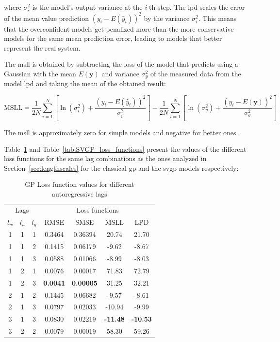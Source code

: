 where $\sigma_i^2$ is the model's output variance at the \textit{i}-th step.
The \acrshort{lpd} scales the error of the mean value prediction $\left(y_i -
E(\hat{y}_i)\right)^{2}$ by the variance $\sigma_i^2$. This means that the
overconfident models get penalized more than the more conservative models for
the same mean prediction error, leading to models that better represent
the real system. 

The \acrfull{msll} is obtained by subtracting the loss of the model that
predicts using a Gaussian with the mean $E(\boldsymbol{y})$ and variance
$\sigma_y^2$ of the measured data from the model \acrshort{lpd} and taking the
mean of the obtained result:

\begin{equation}
    \text{MSLL} = \frac{1}{2N}\sum_{i=1}^N\left[
        \ln{\left(\sigma_i^2\right) + \frac{\left(y_i -
        E\left(\hat{y}_i\right)\right)^2}{\sigma_i^2}}
    \right] - \frac{1}{2N}\sum_{i=1}^N\left[
        \ln{\left(\sigma_y^2\right) + \frac{\left(y_i -
        E\left(\boldsymbol{y}\right)\right)^2}{\sigma_y^2}}
    \right]
\end{equation}

The \acrshort{msll} is approximately zero for simple models and negative for
better ones.

Table~\ref{tab:GP_loss_functions} and Table~\ref{tab:SVGP_loss_functions}
present the values of the different loss functions for the same lag combinations
as the ones analyzed in Section~\ref{sec:lengthscales} for the classical
\acrshort{gp} and the \acrshort{svgp} models respectively: 

\begin{table}[ht]
\centering
    \begin{tabular}{||c c c|c c c c||}
        \hline
        \multicolumn{3}{||c|}{Lags} & \multicolumn{4}{c||}{Loss functions}\\
        $l_w$ & $l_u$ & $l_y$ & RMSE & SMSE & MSLL & LPD\\
        \hline \hline
        1 & 1 & 1 & 0.3464 & 0.36394 & 20.74 & 21.70 \\
        1 & 1 & 2 & 0.1415 & 0.06179 & -9.62 & -8.67 \\
        1 & 1 & 3 & 0.0588 & 0.01066 & -8.99 & -8.03 \\
        1 & 2 & 1 & 0.0076 & 0.00017 & 71.83 & 72.79 \\
        1 & 2 & 3 & \textbf{0.0041} & \textbf{0.00005} & 31.25 & 32.21 \\
        2 & 1 & 2 & 0.1445 & 0.06682 & -9.57 & -8.61 \\
        2 & 1 & 3 & 0.0797 & 0.02033 & -10.94 & -9.99 \\
        3 & 1 & 3 & 0.0830 & 0.02219 & \textbf{-11.48} & \textbf{-10.53} \\
        3 & 2 & 2 & 0.0079 & 0.00019 & 58.30 & 59.26 \\
        \hline
    \end{tabular}
\caption{GP Loss function values for different autoregressive lags}
\label{tab:GP_loss_functions}
\end{table}

